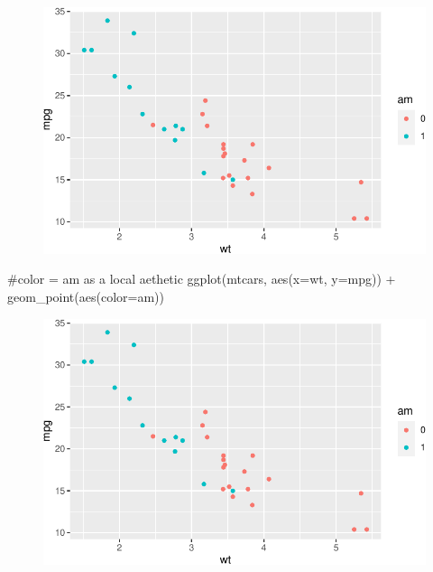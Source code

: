 \documentclass[
  letterpaper,
  DIV=11,
  numbers=noendperiod]{scrartcl}
\newenvironment{Shaded}{\begin{snugshade}}{\end{snugshade}}
\newcommand{\AttributeTok}[1]{\textcolor[rgb]{0.40,0.45,0.13}{#1}}
\newcommand{\CommentTok}[1]{\textcolor[rgb]{0.37,0.37,0.37}{#1}}
\newcommand{\FunctionTok}[1]{\textcolor[rgb]{0.28,0.35,0.67}{#1}}
\newcommand{\NormalTok}[1]{\textcolor[rgb]{0.00,0.23,0.31}{#1}}
\newcommand{\SpecialCharTok}[1]{\textcolor[rgb]{0.37,0.37,0.37}{#1}}
\begin{document}
\begin{figure}[H]

{\centering \includegraphics{118_D_ggplot_files/figure-pdf/unnamed-chunk-13-1.pdf}

}

\end{figure}

\begin{Shaded}
\begin{Highlighting}[]
\CommentTok{\#color = am as a local aethetic}
\FunctionTok{ggplot}\NormalTok{(mtcars, }\FunctionTok{aes}\NormalTok{(}\AttributeTok{x=}\NormalTok{wt, }\AttributeTok{y=}\NormalTok{mpg)) }\SpecialCharTok{+}
  \FunctionTok{geom\_point}\NormalTok{(}\FunctionTok{aes}\NormalTok{(}\AttributeTok{color=}\NormalTok{am))}
\end{Highlighting}
\end{Shaded}

\begin{figure}[H]

{\centering \includegraphics{118_D_ggplot_files/figure-pdf/unnamed-chunk-14-1.pdf}

}

\end{figure}
\end{document}
